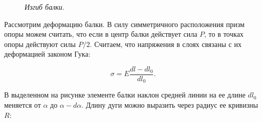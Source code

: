 \documentclass[a4paper,12pt]{report}
\begin{document}
\begin{figure}[h!]
\caption{\textit{Изгиб балки.}}
\end{figure}


Рассмотрим деформацию балки. В силу симметричного расположения призм опоры можем считать, что если в центр балки действует сила $P$, то в точках опоры действуют силы $P/2$. Считаем, что напряжения в слоях связаны с их деформацией законом Гука:

\begin{equation}
	\sigma = E \frac{dl-dl_0}{dl_0}.
	\label{form4}
\end{equation}

В выделенном на рисунке элементе балки наклон средней линии на ее длине $dl_0$ меняется от $\alpha$ до $\alpha - d\alpha$. Длину дуги можно выразить через радиус ее кривизны $R$:
\end{document}
